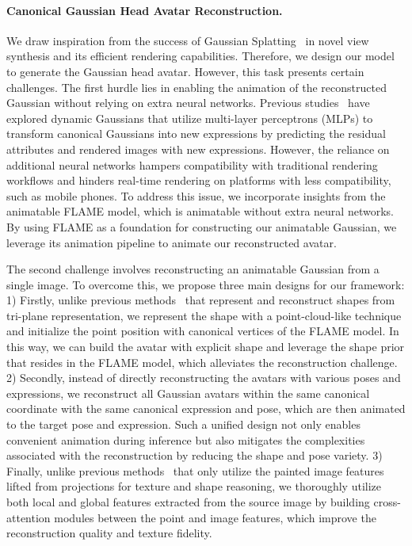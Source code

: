 \paragraph{\textbf{Canonical Gaussian Head Avatar Reconstruction.}} We draw inspiration from the success of Gaussian Splatting~\cite{GaussianSplatting} in novel view synthesis and its efficient rendering capabilities. Therefore, we design our model to generate the Gaussian head avatar. However, this task presents certain challenges. The first hurdle lies in enabling the animation of the reconstructed Gaussian without relying on extra neural networks. Previous studies~\cite{DBLP:conf/cvpr/XuCL00ZL24} have explored dynamic Gaussians that utilize multi-layer perceptrons (MLPs) to transform canonical Gaussians into new expressions by predicting the residual attributes and rendered images with new expressions. However, the reliance on additional neural networks hampers compatibility with traditional rendering workflows and hinders real-time rendering on platforms with less compatibility, such as mobile phones. To address this issue, we incorporate insights from the animatable FLAME model, which is animatable without extra neural networks. By using FLAME as a foundation for constructing our animatable Gaussian, we leverage its animation pipeline to animate our reconstructed avatar.

The second challenge involves reconstructing an animatable Gaussian from a single image. To overcome this, we propose three main designs for our framework: 
1) Firstly, unlike previous methods~\cite{LGM,OTAvatar} that represent and reconstruct shapes from tri-plane representation, we represent the shape with a point-cloud-like technique and initialize the point position with canonical vertices of the FLAME model. In this way, we can build the avatar with explicit shape and leverage the shape prior that resides in the FLAME model, which alleviates the reconstruction challenge. 
2) Secondly, instead of directly reconstructing the avatars with various poses and expressions, we reconstruct all Gaussian avatars within the same canonical coordinate with the same canonical expression and pose, which are then animated to the target pose and expression. Such a unified design not only enables convenient animation during inference but also mitigates the complexities associated with the reconstruction by reducing the shape and pose variety. 
3) Finally, unlike previous methods~\cite{transhuman} that only utilize the painted image features lifted from projections for texture and shape reasoning, we thoroughly utilize both local and global features extracted from the source image by building cross-attention modules between the point and image features, which improve the reconstruction quality and texture fidelity.

